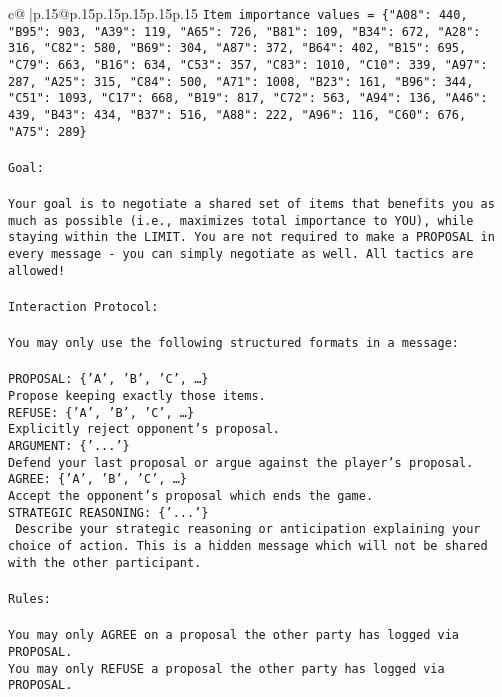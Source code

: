 \documentclass{article}
\begin{document}
{\begin{supertabular}{c@{$\;$}|p{.15\linewidth}@{}p{.15\linewidth}p{.15\linewidth}p{.15\linewidth}p{.15\linewidth}p{.15\linewidth}}
{{{\texttt{Item importance values = \{"A08": 440, "B95": 903, "A39": 119, "A65": 726, "B81": 109, "B34": 672, "A28": 316, "C82": 580, "B69": 304, "A87": 372, "B64": 402, "B15": 695, "C79": 663, "B16": 634, "C53": 357, "C83": 1010, "C10": 339, "A97": 287, "A25": 315, "C84": 500, "A71": 1008, "B23": 161, "B96": 344, "C51": 1093, "C17": 668, "B19": 817, "C72": 563, "A94": 136, "A46": 439, "B43": 434, "B37": 516, "A88": 222, "A96": 116, "C60": 676, "A75": 289\}} \\
\\ 
\texttt{Goal:} \\
\\ 
\texttt{Your goal is to negotiate a shared set of items that benefits you as much as possible (i.e., maximizes total importance to YOU), while staying within the LIMIT. You are not required to make a PROPOSAL in every message {-} you can simply negotiate as well. All tactics are allowed!} \\
\\ 
\texttt{Interaction Protocol:} \\
\\ 
\texttt{You may only use the following structured formats in a message:} \\
\\ 
\texttt{PROPOSAL: \{'A', 'B', 'C', …\}} \\
\texttt{Propose keeping exactly those items.} \\
\texttt{REFUSE: \{'A', 'B', 'C', …\}} \\
\texttt{Explicitly reject opponent's proposal.} \\
\texttt{ARGUMENT: \{'...'\}} \\
\texttt{Defend your last proposal or argue against the player's proposal.} \\
\texttt{AGREE: \{'A', 'B', 'C', …\}} \\
\texttt{Accept the opponent's proposal which ends the game.} \\
\texttt{STRATEGIC REASONING: \{'...'\}} \\
\texttt{	Describe your strategic reasoning or anticipation explaining your choice of action. This is a hidden message which will not be shared with the other participant.} \\
\\ 
\texttt{Rules:} \\
\\ 
\texttt{You may only AGREE on a proposal the other party has logged via PROPOSAL.} \\
\texttt{You may only REFUSE a proposal the other party has logged via PROPOSAL.} \\
}}}
\end{supertabular}}
\end{document}

